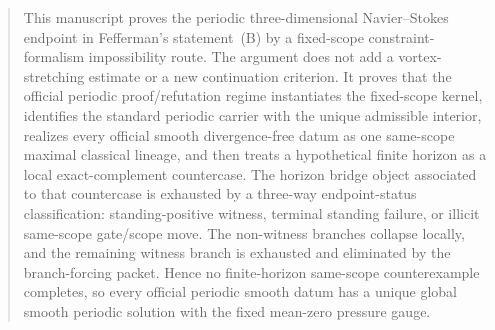 \begin{abstract}
This manuscript proves the periodic three-dimensional Navier--Stokes endpoint in Fefferman's statement~(B) by a fixed-scope constraint-formalism impossibility route. The argument does not add a vortex-stretching estimate or a new continuation criterion. It proves that the official periodic proof/refutation regime instantiates the fixed-scope kernel, identifies the standard periodic carrier with the unique admissible interior, realizes every official smooth divergence-free datum as one same-scope maximal classical lineage, and then treats a hypothetical finite horizon as a local exact-complement countercase. The horizon bridge object associated to that countercase is exhausted by a three-way endpoint-status classification: standing-positive witness, terminal standing failure, or illicit same-scope gate/scope move. The non-witness branches collapse locally, and the remaining witness branch is exhausted and eliminated by the branch-forcing packet. Hence no finite-horizon same-scope counterexample completes, so every official periodic smooth datum has a unique global smooth periodic solution with the fixed mean-zero pressure gauge.
\end{abstract}

\tableofcontents
\clearpage
